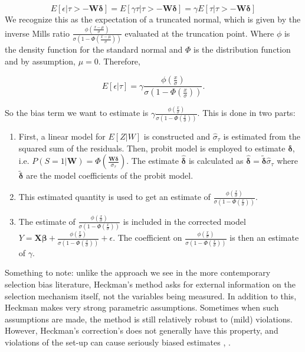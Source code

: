 \documentclass[12pt,twoside]{reedthesis}
\theoremstyle{definition}
\begin{document}
$$E[\epsilon | \tau >  - \mathbf{W} \boldsymbol{\delta}] = E[\gamma \tau | \tau >   - \mathbf{W} \boldsymbol{\delta}] = \gamma E[ \tau | \tau >   - \mathbf{W} \boldsymbol{\delta}]$$																																																												
We recognize this as the expectation of a truncated normal, which is given by the inverse Mills ratio $\frac{\phi(\frac{x- \mu}{\sigma})}{\sigma(1 - \Phi(\frac{x - \mu}{\sigma}))}$ evaluated at the truncation point. Where $\phi$ is the density function for the standard normal and $\Phi$ is the distribution function and by assumption, $\mu = 0$. Therefore,						

$$E[\epsilon | \tau] = \gamma \frac{\phi(\frac{x}{\sigma})}{\sigma(1 - \Phi(\frac{x}{\sigma}))}.$$				

So the bias term  we want to estimate is $\gamma \frac{\phi(\frac{x}{\sigma})}{\sigma(1 - \Phi(\frac{x}{\sigma}))}$. This is done in two parts:

\begin{enumerate}
\item First, a linear model for $E[Z | W]$ is constructed and $\hat \sigma_{\tau}$ is estimated from the squared sum of the residuals. Then, probit model is employed to estimate $\boldsymbol{\delta}$, i.e. $P(S = 1 | \mathbf{W}) = \Phi(\frac{ \mathbf{W} \boldsymbol{\delta}}{\sigma_{\tau}})$. The estimate $\boldsymbol{\hat \delta}$ is calculated as $\boldsymbol{\hat \delta} = \boldsymbol{\tilde{\delta}} \hat \sigma_{\tau}$ where $\boldsymbol{\tilde{\delta}}$ are the model coefficients of the probit model.

\item This estimated quantity is used to get an estimate of  $\frac{\phi(\frac{x}{\sigma})}{\sigma(1 - \Phi(\frac{x}{\sigma}))}$.

\item The estimate of $\frac{\phi(\frac{x}{\sigma})}{\sigma(1 - \Phi(\frac{x}{\sigma}))}$ is included in the corrected model $Y = \mathbf{X} \boldsymbol{\beta} + \frac{\phi(\frac{x}{\sigma})}{\sigma(1 - \Phi(\frac{x}{\sigma}))} + \epsilon$. The coefficient on $\frac{\phi(\frac{x}{\sigma})}{\sigma(1 - \Phi(\frac{x}{\sigma}))}$ is then an estimate of $\gamma$. 
\end{enumerate}
						
Something to note: unlike the approach we see in the more contemporary selection bias literature, Heckman's method asks for external information on the selection mechanism itself, not the variables being measured. In addition to this, Heckman makes very strong parametric assumptions. Sometimes when such assumptions are made, the method is still relatively robust to (mild) violations.  However, Heckman's correction's does not generally have this property, and violations of the set-up can cause seriously biased estimates \citep{Little_1986}, \citep{Bushway_2007}. 
\end{document}
